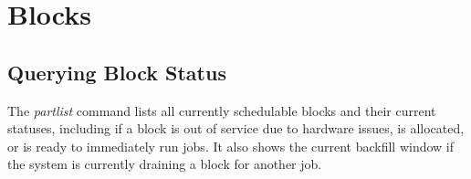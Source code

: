\documentclass[12pt,letterpaper]{article}
\begin{document}
\section*{Blocks}

\subsection{Querying Block Status}

The \textit{partlist} command lists all currently schedulable blocks and their current statuses, including if a block is out of service due to hardware issues, is allocated, or is ready to immediately run jobs.  It also shows the current backfill window if the system is currently draining a block for another job.
\end{document}
